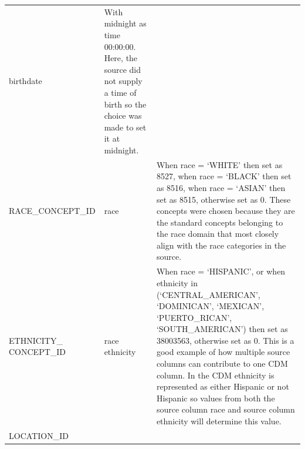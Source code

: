 \documentclass[10.5pt]{book}
\theoremstyle{definition}
\theoremstyle{definition}
\theoremstyle{definition}
\theoremstyle{remark}
\begin{document}
\begin{longtable}[]{@{}lll@{}}
\begin{minipage}[t]{0.13\columnwidth}
birthdate\strut
\end{minipage} & \begin{minipage}[t]{0.50\columnwidth}\raggedright\strut
With midnight as time 00:00:00. Here, the source did not supply a time
of birth so the choice was made to set it at midnight.\strut
\end{minipage}\tabularnewline
\begin{minipage}[t]{0.28\columnwidth}\raggedright\strut
RACE\_CONCEPT\_ID\strut
\end{minipage} & \begin{minipage}[t]{0.13\columnwidth}\raggedright\strut
race\strut
\end{minipage} & \begin{minipage}[t]{0.50\columnwidth}\raggedright\strut
When race = `WHITE' then set as 8527, when race = `BLACK' then set as
8516, when race = `ASIAN' then set as 8515, otherwise set as 0. These
concepts were chosen because they are the standard concepts belonging to
the race domain that most closely align with the race categories in the
source.\strut
\end{minipage}\tabularnewline
\begin{minipage}[t]{0.28\columnwidth}\raggedright\strut
ETHNICITY\_ CONCEPT\_ID\strut
\end{minipage} & \begin{minipage}[t]{0.13\columnwidth}\raggedright\strut
race ethnicity\strut
\end{minipage} & \begin{minipage}[t]{0.50\columnwidth}\raggedright\strut
When race = `HISPANIC', or when ethnicity in (`CENTRAL\_AMERICAN',
`DOMINICAN', `MEXICAN', `PUERTO\_RICAN', `SOUTH\_AMERICAN') then set as
38003563, otherwise set as 0. This is a good example of how multiple
source columns can contribute to one CDM column. In the CDM ethnicity is
represented as either Hispanic or not Hispanic so values from both the
source column race and source column ethnicity will determine this
value.\strut
\end{minipage}\tabularnewline
\begin{minipage}[t]{0.28\columnwidth}\raggedright\strut
LOCATION\_ID\strut
\end{minipage} & \begin{minipage}[t]{0.13\columnwidth}\raggedright\strut
\strut
\end{minipage} & \begin{minipage}[t]{0.50\columnwidth}\raggedright\strut
\strut
\end{minipage}\tabularnewline

\end{longtable}
\end{document}
